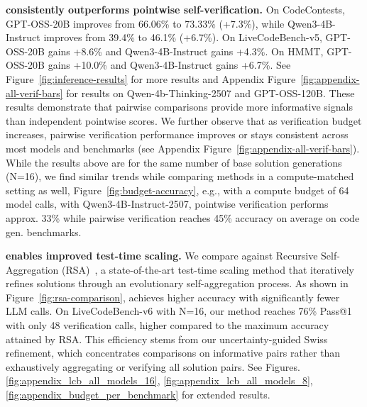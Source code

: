 \textbf{\pairinfer{} consistently outperforms pointwise self-verification.}
On CodeContests, GPT-OSS-20B improves from 66.06\% to 73.33\% (+7.3\%), while Qwen3-4B-Instruct improves from 39.4\% to 46.1\% (+6.7\%). On LiveCodeBench-v5, GPT-OSS-20B gains +8.6\% and Qwen3-4B-Instruct gains +4.3\%. On HMMT, GPT-OSS-20B gains +10.0\% and Qwen3-4B-Instruct gains +6.7\%. See Figure~\ref{fig:inference-results} for more results and Appendix Figure~\ref{fig:appendix-all-verif-bars} for results on Qwen-4b-Thinking-2507 and GPT-OSS-120B. These results demonstrate that pairwise comparisons provide more informative signals than independent pointwise scores. We further observe that as verification budget increases, pairwise verification performance improves or stays consistent across most models and benchmarks (see Appendix Figure~\ref{fig:appendix-all-verif-bars}). While the results above are for the same number of base solution generations (N=16), we find similar trends while comparing methods in a compute-matched setting as well, Figure~\ref{fig:budget-accuracy}, e.g., with a compute budget of 64 model calls, with Qwen3-4B-Instruct-2507, pointwise verification performs approx. 33\% while pairwise verification reaches 45\% accuracy on average on code gen. benchmarks.


\textbf{\pairinfer{} enables improved test-time scaling.} We compare against Recursive Self-Aggregation (RSA)~\citep{venkatraman2025recursiveselfaggregationunlocksdeep}, a state-of-the-art test-time scaling method that iteratively refines solutions through an evolutionary self-aggregation process. As shown in Figure~\ref{fig:rsa-comparison}, \pairinfer{} achieves higher accuracy with significantly fewer LLM calls. On LiveCodeBench-v6 with N=16, our method reaches 76\% Pass@1 with only 48 verification calls, higher compared to the maximum accuracy attained by RSA. This efficiency stems from our uncertainty-guided Swiss refinement, which concentrates comparisons on informative pairs rather than exhaustively aggregating or verifying all solution pairs. See Figures.  \ref{fig:appendix_lcb_all_models_16}, \ref{fig:appendix_lcb_all_models_8}, \ref{fig:appendix_budget_per_benchmark} for extended results.

